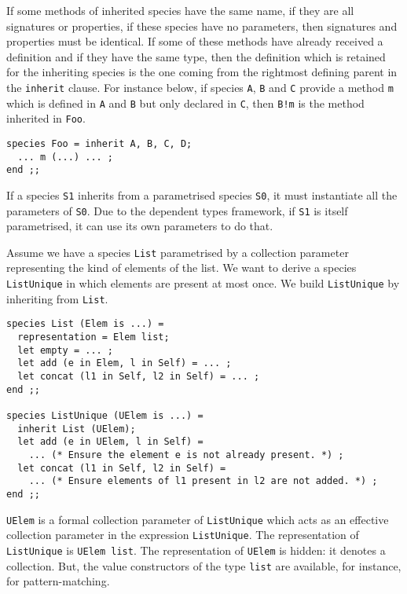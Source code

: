 If some methods of inherited species have the same name, if they are all
signatures or properties, if these species have no parameters, then
signatures and properties must be identical. If some of these methods have
already received a definition and if they have the same type, then the
definition which is retained for the inheriting species is the one coming
from the rightmost defining parent in the {\tt inherit} clause. For instance
below, if species {\tt A}, {\tt B} and {\tt C} provide a method {\tt m} which
is defined in {\tt A} and {\tt B} but only declared in {\tt C}, then
{\tt B!m} is the method inherited in {\tt Foo}.

{\scriptsize
\begin{lstlisting}
species Foo = inherit A, B, C, D;
  ... m (...) ... ;
end ;;
\end{lstlisting}
}

\smallskip
{}
If a species {\tt S1} inherits from a parametrised species {\tt S0},
it must instantiate all the parameters of {\tt S0}. Due to the
dependent types framework, if {\tt S1} is itself
parametrised, it can use its own parameters to do that.

Assume we have a species {\tt List} parametrised by a collection parameter
representing the kind of elements of the list. We want to derive
a species {\tt ListUnique} in which elements are present at most
once. We build {\tt ListUnique} by inheriting from {\tt List}.

{\scriptsize
\begin{lstlisting}
species List (Elem is ...) =
  representation = Elem list;
  let empty = ... ;
  let add (e in Elem, l in Self) = ... ;
  let concat (l1 in Self, l2 in Self) = ... ;
end ;;

species ListUnique (UElem is ...) =
  inherit List (UElem);
  let add (e in UElem, l in Self) =
    ... (* Ensure the element e is not already present. *) ;
  let concat (l1 in Self, l2 in Self) =
    ... (* Ensure elements of l1 present in l2 are not added. *) ;
end ;;
\end{lstlisting}
}

{\tt UElem} is a formal collection parameter of {\tt ListUnique} which acts
as an effective collection parameter in the expression {\tt ListUnique}. The
representation of {\tt ListUnique} is {\tt UElem list}. The representation of
{\tt UElem} is hidden: it denotes a collection. But, the value constructors
of the type {\tt list} are available, for instance, for pattern-matching.

